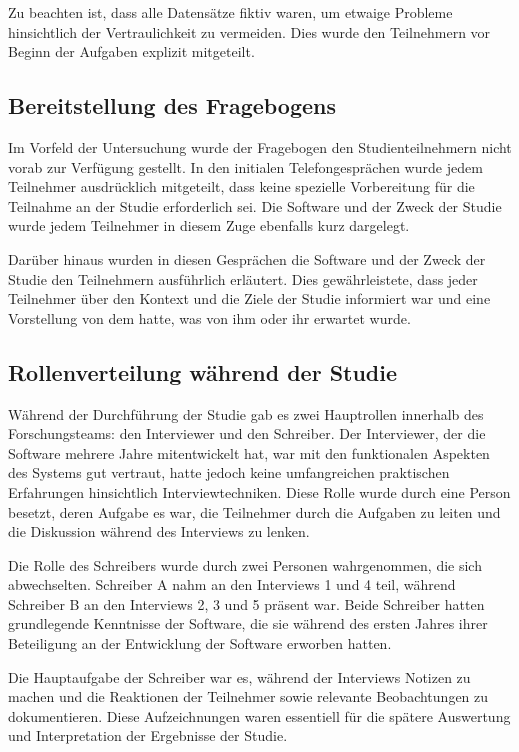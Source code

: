 Zu beachten ist, dass alle Datensätze fiktiv waren, um etwaige Probleme hinsichtlich der Vertraulichkeit zu vermeiden. Dies wurde den Teilnehmern vor Beginn der Aufgaben explizit mitgeteilt.

\subsection{Bereitstellung des Fragebogens}

Im Vorfeld der Untersuchung wurde der Fragebogen den Studienteilnehmern nicht vorab zur Verfügung gestellt. In den initialen Telefongesprächen wurde jedem Teilnehmer ausdrücklich mitgeteilt, dass keine spezielle Vorbereitung für die Teilnahme an der Studie erforderlich sei. Die Software und der Zweck der Studie wurde jedem Teilnehmer in diesem Zuge ebenfalls kurz dargelegt.

Darüber hinaus wurden in diesen Gesprächen die Software und der Zweck der Studie den Teilnehmern ausführlich erläutert. Dies gewährleistete, dass jeder Teilnehmer über den Kontext und die Ziele der Studie informiert war und eine Vorstellung von dem hatte, was von ihm oder ihr erwartet wurde.

\subsection{Rollenverteilung während der Studie}

Während der Durchführung der Studie gab es zwei Hauptrollen innerhalb des Forschungsteams: den Interviewer und den Schreiber. Der Interviewer, der die Software mehrere Jahre mitentwickelt hat, war mit den funktionalen Aspekten des Systems gut vertraut, hatte jedoch keine umfangreichen praktischen Erfahrungen hinsichtlich Interviewtechniken. Diese Rolle wurde durch eine Person besetzt, deren Aufgabe es war, die Teilnehmer durch die Aufgaben zu leiten und die Diskussion während des Interviews zu lenken.

Die Rolle des Schreibers wurde durch zwei Personen wahrgenommen, die sich abwechselten. Schreiber A nahm an den Interviews 1 und 4 teil, während Schreiber B an den Interviews 2, 3 und 5 präsent war. Beide Schreiber hatten grundlegende Kenntnisse der Software, die sie während des ersten Jahres ihrer Beteiligung an der Entwicklung der Software erworben hatten.

Die Hauptaufgabe der Schreiber war es, während der Interviews Notizen zu machen und die Reaktionen der Teilnehmer sowie relevante Beobachtungen zu dokumentieren. Diese Aufzeichnungen waren essentiell für die spätere Auswertung und Interpretation der Ergebnisse der Studie.

